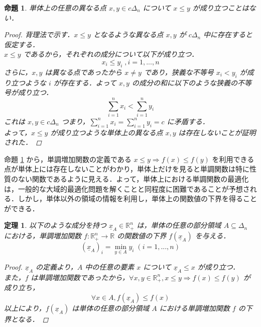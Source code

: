 \documentclass[a4paper,11pt]{jreport}
\newtheorem{theorem}{定理}
\newtheorem{proposition}{命題}
\begin{document}
\begin{proposition} \label{prop:inequality_on_simplex}
単体上の任意の異なる点 $ x, y \in c \Delta_n $ について $ x \leq y $ が成り立つことはない．

\begin{proof}
背理法で示す．$ x \leq y $ となるような異なる点 $ x, y $ が $ c \Delta_n $ 中に存在すると仮定する．\\
$ x \leq y $ であるから，それぞれの成分について以下が成り立つ．
$$ x_i \leq y_i \;, i = 1, ..., n $$
さらに，$ x , y $ は異なる点であったから $ x \neq y $ であり，狭義な不等号 $ x_i < y_i $ が成り立つような $ i $ が存在する．よって $ x, y $ の成分の和に以下のような狭義の不等号が成り立つ．
$$ \sum_{i=1}^n x_i < \sum_{i=1}^n y_i $$
これは $ x, y \in c \Delta_n $ つまり，$ \sum_{i=1}^n x_i = \sum_{i=1}^n y_i = c $ に矛盾する．\\
よって，$ x \leq y $ が成り立つような単体上の異なる点 $ x, y $ は存在しないことが証明された．
\end{proof}

\end{proposition}

命題 \ref{prop:inequality_on_simplex} から，単調増加関数の定義である $ x \leq y \Rightarrow f(x) \leq f(y) $ を利用できる点が単体上には存在しないことがわかり，単体上だけを見ると単調関数は特に性質のない関数であるように見える．よって，単体上における単調関数の最適化は，一般的な大域的最適化問題を解くことと同程度に困難であることが予想される．しかし，単体以外の領域の情報を利用し，単体上の関数値の下界を得ることができる．

\begin{theorem}\label{thm:lower_bound_of_monotonic_function}
以下のような成分を持つ $ \underline{x}_A \in \mathbb{R}^n_{+} $ は，単体の任意の部分領域 $ A \subseteq \Delta_n $ における，単調増加関数 $ f :  \mathbb{R}^n_{+} \to \mathbb{R} $ の関数値の下界 $ f(\underline{x}_A) $ を与える．
$$ (\underline{x}_A)_i = \min_{y \in A } y_i \; (i = 1, ..., n) $$

\begin{proof}
$ \underline{x}_A $ の定義より，$ A $ 中の任意の要素 $ x $ について $ \underline{x}_A \leq x $ が成り立つ．\\
また，$ f $ は単調増加関数であったから，$ \forall x, y \in \mathbb{R}^n_{+}, x \leq y \Rightarrow f(x) \leq f(y) $ が成り立ち，
$$ \forall x \in A, f(\underline{x}_A) \leq f(x) $$
以上により，$ f(\underline{x}_A) $ は単体の任意の部分領域 $ A $ における単調増加関数 $ f $ の下界となる．
\end{proof}

\end{theorem}
\end{document}
